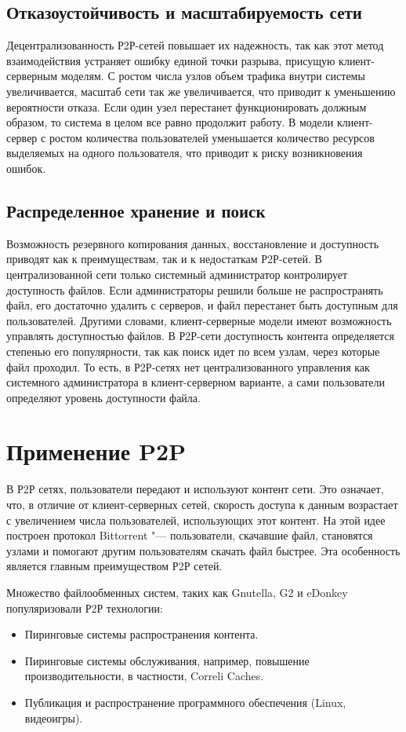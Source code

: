 \documentclass[bachelor, och, coursework]{SCWorks}
\begin{document}
\subsection{Отказоустойчивость и масштабируемость сети}
Децентрализованность Р2Р-сетей повышает их надежность, так как этот метод взаимодействия устраняет ошибку единой точки разрыва, присущую клиент-серверным моделям. С ростом числа узлов объем трафика внутри системы увеличивается, масштаб сети так же увеличивается, что приводит к уменьшению вероятности отказа. Если один узел перестанет функционировать должным образом, то система в целом все равно продолжит работу. 
В модели клиент-сервер с ростом количества пользователей уменьшается количество ресурсов выделяемых на одного пользователя, что приводит к риску возникновения ошибок.

\subsection{Распределенное хранение и поиск}
Возможность резервного копирования данных, восстановление и доступность приводят как к преимуществам, так и к недостаткам Р2Р-сетей. 
В централизованной сети только системный администратор контролирует доступность файлов. 
Если администраторы решили больше не распространять файл, его достаточно удалить с серверов,
и файл перестанет быть доступным для пользователей. Другими словами, клиент-серверные модели имеют возможность управлять доступностью файлов. В Р2Р-сети доступность контента определяется степенью его популярности, так как поиск идет по всем узлам, через которые файл проходил. 
То есть, в Р2Р-сетях нет централизованного управления как системного администратора в клиент-серверном варианте, 
а сами пользователи определяют уровень доступности файла.

\section{Применение P2P}
В Р2Р сетях, пользователи передают и используют контент сети. Это означает, что, в отличие от клиент-серверных сетей, 
скорость доступа к данным возрастает с увеличением числа пользователей, использующих этот контент. 
На этой идее построен протокол Bittorrent "--- пользователи, скачавшие файл, становятся узлами и помогают другим пользователям скачать файл быстрее. 
Эта особенность является главным преимуществом Р2Р сетей.

Множество файлообменных систем, таких как Gnutella, G2 и eDonkey популяризовали Р2Р технологии:
\begin{itemize}
    \item Пиринговые системы распространения контента.
    \item Пиринговые системы обслуживания, например, повышение производительности, в частности, Correli Caches.
    \item Публикация и распространение программного обеспечения (Linux, видеоигры).
\end{itemize}
\end{document}

